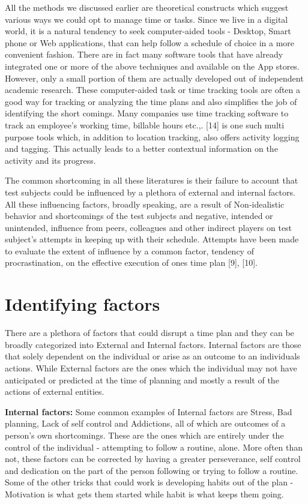 \documentclass[conference]{IEEEtran}
\begin{document}
All the methods we discussed earlier are theoretical constructs which suggest various ways we could opt to manage time or tasks. Since we live in a digital world, it is a natural tendency to seek computer-aided tools - Desktop, Smart phone or Web applications, that can help follow a schedule of choice in a more convenient fashion. There are in fact many software tools that have already integrated one or more of the above techniques and available on the App stores. However, only a small portion of them are actually developed out of independent academic research. These computer-aided task or time tracking tools are often a good way for tracking or analyzing the time plans and also simplifies the job of identifying the short comings. Many companies use time tracking software to track an employee's working time, billable hours etc.,. [14] is one such multi purpose tools which, in addition to location tracking, also offers activity logging and tagging. This actually leads to a better contextual information on the activity and its progress.

The common shortcoming in all these literatures is their failure to account that test subjects could be influenced by a plethora of external and internal factors. All these influencing factors, broadly speaking, are a result of Non-idealistic behavior and shortcomings of the test subjects and negative, intended or unintended, influence from peers, colleagues and other indirect players on test subject's attempts in keeping up with their schedule. Attempts have been made to evaluate the extent of influence by a common factor, tendency of procrastination, on the effective execution of ones time plan [9], [10].


\section{Identifying factors}
There are a plethora of factors that could disrupt a time plan and they can be broadly categorized into External and Internal factors. Internal factors are those that solely dependent on the individual or arise as an outcome to an individuals actions. While External factors are the ones which the individual may not have anticipated or predicted at the time of planning and mostly a result of the actions of external entities.

\textbf{Internal factors:} Some common examples of Internal factors are Stress, Bad planning, Lack of self control and Addictions, all of which are outcomes of a person's own shortcomings. These are the ones which are entirely under the control of the individual - attempting to follow a routine, alone. More often than not, these factors can be corrected by having a greater perseverance, self control and dedication on the part of the person following or trying to follow a routine. Some of the other tricks that could work is developing habits out of the plan - Motivation is what gets them started while habit is what keeps them going.
\end{document}
